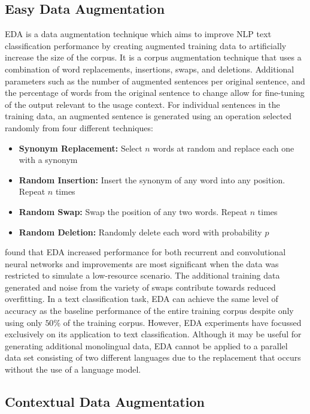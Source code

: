 \subsection{Easy Data Augmentation}
\acrfull{EDA} is a data augmentation technique which aims to improve \acrshort{NLP} text classification performance by creating augmented training data to artificially increase the size of the corpus. It is a corpus augmentation technique that uses a combination of word replacements, insertions, swaps, and deletions. Additional parameters such as the number of augmented sentences per original sentence, and the percentage of words from the original sentence to change allow for fine-tuning of the output relevant to the usage context. For individual sentences in the training data, an augmented sentence is generated using an operation selected randomly from four different techniques:
\begin{itemize}
    \item \textbf{Synonym Replacement:} Select $n$ words at random and replace each one with a synonym
    \item \textbf{Random Insertion:} Insert the synonym of any word into any position. Repeat $n$ times
    \item \textbf{Random Swap:} Swap the position of any two words. Repeat $n$ times
    \item \textbf{Random Deletion:} Randomly delete each word with probability $p$
\end{itemize}

\cite{wei_eda:_2019} found that \acrshort{EDA} increased performance for both recurrent and convolutional neural networks and improvements are most significant when the data was restricted to simulate a low-resource scenario. The additional training data generated and noise from the variety of swaps contribute towards reduced overfitting. In a text classification task, \acrshort{EDA} can achieve the same level of accuracy as the baseline performance of the entire training corpus despite only using only $50$\% of the training corpus. However, \acrshort{EDA} experiments have focussed exclusively on its application to text classification. Although it may be useful for generating additional monolingual data, \acrshort{EDA} cannot be applied to a parallel data set consisting of two different languages due to the replacement that occurs without the use of a language model.

\subsection{Contextual Data Augmentation}

